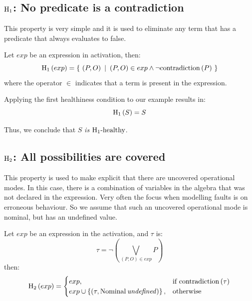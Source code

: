\subsection[H1: No predicate is a contradiction]{$\healthiness[1]$: No predicate is a contradiction}
\label{sec:h1}

This property is very simple and it is used to eliminate any term that has a predicate that always evaluates to false.

\begin{definition}
Let $exp$ be an expression in \ac{activation}, then:
%
\begin{equation}
\healthinessfun[1]{exp} = \left\{~\left(P,O\right) ~|~ \left(P,O\right) \in exp \land \lnot \contradiction{P} ~\right\}
\end{equation}
%
where the operator $\in$ indicates that a term is present in the expression.
\end{definition}

Applying the first healthiness condition to our example results in:
\[\healthinessfun[1]{S} = S\]

Thus, we conclude that $S$ \emph{is} $\healthy[1]$.

\subsection[H2: All possibilities are covered]{$\healthiness[2]$: All possibilities are covered}
\label{sec:h2}

This property is used to make explicit that there are uncovered operational modes.
In this case, there is a combination of variables in the algebra that was not declared in the expression.
Very often the focus when modelling faults is on erroneous behaviour.
So we assume that such an uncovered operational mode is nominal, but has an undefined value.

\begin{definition}
Let $exp$ be an expression in the \ac{activation}, and $\tau$ is:
\[
\tau = \lnot \left (\bigvee_{\left(P,O\right)\in exp} P\right)
\]
%
then:
%
\begin{equation}
\healthinessfun[2]{exp} = 
  \begin{cases}
    exp, & \text{if } \contradiction{\tau}\\
    exp \cup \left\{\left(\tau,\Nominal{\undefinednominal}\right)\right\}, & \text{otherwise}
  \end{cases}
\end{equation}

\end{definition}

